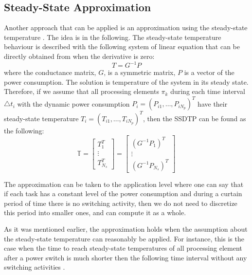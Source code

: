 \subsection{Steady-State Approximation}
Another approach that can be applied is an approximation using the steady-state temperature \cite{huang2009}. The idea is in the following. The steady-state temperature behaviour is described with the following system of linear equation that can be directly obtained from  when the derivative is zero:
\[
  T = G^{-1} P
\]
where the conductance matrix, $G$, is a symmetric matrix, $P$ is a vector of the power consumption. The solution is temperature of the system in its steady state. Therefore, if we assume that all processing elements $\pi_k$ during each time interval $\triangle t_i$ with the dynamic power consumption $P_i = ( P_{i1}, \dots, P_{i N_p } )^T$ have their steady-state temperature $T_i = ( T_{i1}, \dots, T_{i N_p} )^T$, then the SSDTP can be found as the following:
\begin{equation*}
  \mathbb{T} = \left[
    \begin{array}{c}
      T_1^T \\
      \vdots \\
      T_{N_s}^T
    \end{array}
  \right] = \left[
    \begin{array}{c}
      (G^{-1} P_1)^T \\
      \vdots \\
      (G^{-1} P_{N_s})^T
    \end{array}
  \right]
\end{equation*}

The approximation can be taken to the application level where one can say that if each task has a constant level of the power consumption and during a curtain period of time there is no switching activity, then we do not need to discretize this period into smaller ones, and can compute it as a whole.

As it was mentioned earlier, the approximation holds when the assumption about the steady-state temperature can reasonably be applied. For instance, this is the case when the time to reach steady-state temperatures of all processing element after a power switch is much shorter then the following time interval without any switching activities \cite{huang2009}.
